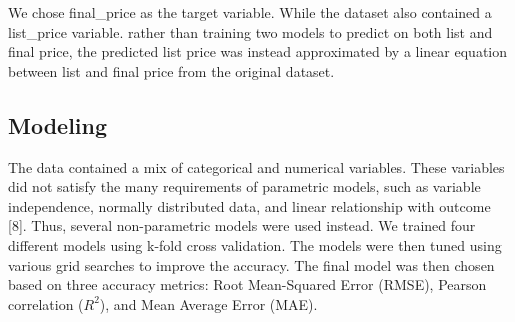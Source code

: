 \documentclass[11pt,]{article}
\begin{document}
We chose final\_price as the target variable. While the dataset also
contained a list\_price variable. rather than training two models to
predict on both list and final price, the predicted list price was
instead approximated by a linear equation between list and final price
from the original dataset.

\hypertarget{modeling}{%
\subsection{Modeling}\label{modeling}}

The data contained a mix of categorical and numerical variables. These
variables did not satisfy the many requirements of parametric models,
such as variable independence, normally distributed data, and linear
relationship with outcome {[}8{]}. Thus, several non-parametric models
were used instead. We trained four different models using k-fold cross
validation. The models were then tuned using various grid searches to
improve the accuracy. The final model was then chosen based on three
accuracy metrics: Root Mean-Squared Error (RMSE), Pearson correlation
(\(R^2\)), and Mean Average Error (MAE).
\end{document}
